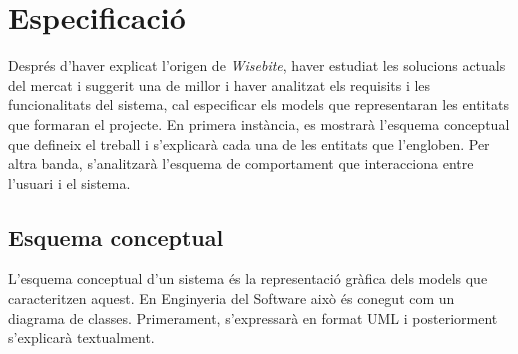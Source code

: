 
\chapter{Especificació} %

\label{Chapter5} %

Després d'haver explicat l'origen de \textit{Wisebite}, haver estudiat les solucions actuals del mercat i suggerit una de millor i haver analitzat els requisits i les funcionalitats del sistema, cal especificar els models que representaran les entitats que formaran el projecte. En primera instància, es mostrarà l'esquema conceptual que defineix el treball i s'explicarà cada una de les entitats que l'engloben. Per altra banda, s'analitzarà l'esquema de comportament que interacciona entre l'usuari i el sistema.


\section{Esquema conceptual}

L'esquema conceptual d'un sistema és la representació gràfica dels models que caracteritzen aquest. En Enginyeria del Software això és conegut com un diagrama de classes\cite{diagramaclases}. Primerament, s'expressarà en format UML i posteriorment s'explicarà textualment.

